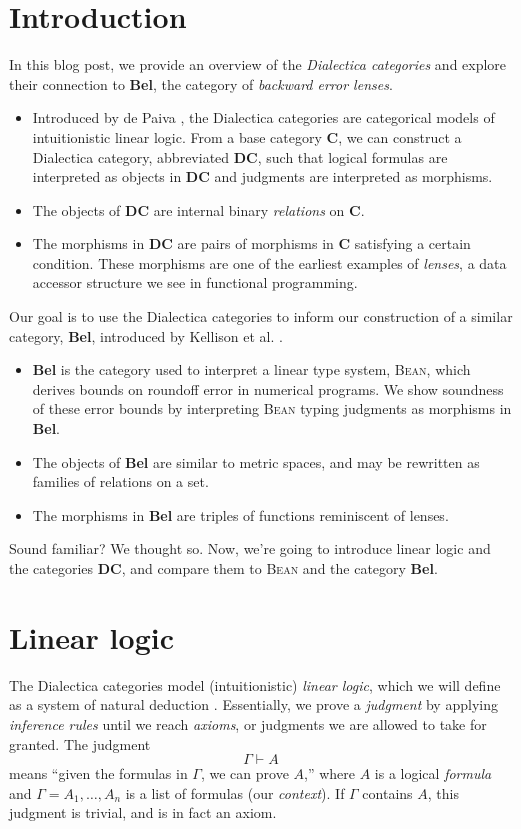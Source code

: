 \documentclass[a4paper]{article}
\newcommand{\DC}{\textbf{DC}}
\newcommand{\C}{\textbf{C}}
\newcommand{\Bel}{\textbf{Bel}}
\newcommand{\Bean}{\textsc{Bean}}
\begin{document}
\section{Introduction}
In this blog post, we provide an overview of the \emph{Dialectica categories} and explore their connection to \Bel{}, the category of \emph{backward error lenses}.
\begin{itemize}
    \item Introduced by de Paiva \cite{de1991dialectica}, the Dialectica categories are categorical models of intuitionistic linear logic. From a base category \C, we can construct a Dialectica category, abbreviated \DC{}, such that logical formulas are interpreted as objects in \DC{} and judgments are interpreted as morphisms. 
    \item The objects of \DC{} are internal binary \emph{relations} on \C.
    \item The morphisms in \DC{} are pairs of morphisms in \C{} satisfying a certain condition. These morphisms are one of the earliest examples of \emph{lenses}, a data accessor structure we see in functional programming.
\end{itemize} 

Our goal is to use the Dialectica categories to inform our construction of a similar category, \Bel, introduced by Kellison et al. \cite{kellison2025bean}.
\begin{itemize}
    \item \Bel{} is the category used to interpret a linear type system, \Bean{}, which derives bounds on roundoff error in numerical programs. We show soundness of these error bounds by interpreting \Bean{} typing judgments as morphisms in \textbf{Bel}.
    \item The objects of \Bel{} are similar to metric spaces, and may be rewritten as families of relations on a set.
    \item The morphisms in \Bel{} are triples of functions reminiscent of lenses. 
\end{itemize}
Sound familiar? We thought so. Now, we're going to introduce linear logic and the categories \DC{}, and compare them to \Bean{} and the category \Bel{}.

\section{Linear logic}
The Dialectica categories model (intuitionistic) \emph{linear logic}, which we will define as a system of natural deduction \cite{nlab:natural_deduction}. Essentially, we prove a \emph{judgment} by applying \emph{inference rules} until we reach \emph{axioms}, or judgments we are allowed to take for granted. The judgment
\begin{equation*}
    \Gamma\vdash A
\end{equation*}
means ``given the formulas in $\Gamma$, we can prove $A$,'' where $A$ is a logical \emph{formula} and $\Gamma=A_1,\dots,A_n$ is a list of formulas (our \emph{context}). If $\Gamma$ contains $A$, this judgment is trivial, and is in fact an axiom.
\end{document}
